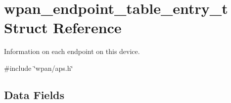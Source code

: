\hypertarget{structwpan__endpoint__table__entry__t}{\section{wpan\-\_\-endpoint\-\_\-table\-\_\-entry\-\_\-t Struct Reference}
\label{structwpan__endpoint__table__entry__t}
}


Information on each endpoint on this device.  




{\ttfamily \#include \char`\"{}wpan/aps.\-h\char`\"{}}

\subsection*{Data Fields}
